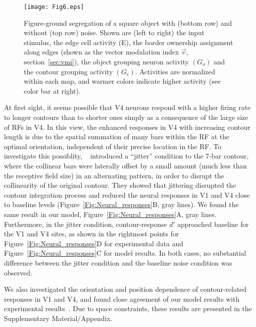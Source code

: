 {\begin{figure*}
\begin{center}
\texttt{[image: Fig6.eps]}
\end{center}
\caption{Figure-ground segregation of a square object with (bottom
  row) and without (top row) noise. Shown are (left to right) the input
  stimulus, the edge cell activity (E), the border ownership
  assignment along edges (shown as the vector modulation index $\vec{v}$,
  section~\ref{sec:vmi}), the object grouping 
  neuron activity 
$(G_o)$
 and the contour grouping activity
$(G_c)$.
 Activities are normalized within each map, and warmer colors
  indicate higher activity (see color bar at right).}
\label{Fig:Square}
\end{figure*}

At first sight, it seems possible that 
V4 neurons respond with a higher firing rate to longer contours than
to shorter ones simply as a consequence of 
the large size of RFs in V4. 
In this view, the enhanced responses in V4 with increasing contour
length is due to the spatial summation of many bars
within the RF at the optimal orientation,
independent of their precise location in the RF. 
To  investigate this possiblity,
~\cite{Chen_etal14} introduced a ``jitter'' condition to the 7-bar
contour, where the collinear bars were laterally offset 
by a small amount (much less than the receptive field size)
in an alternating pattern, in order to disrupt the collinearity of the original contour. They showed that jittering disrupted the
contour integration process and reduced the neural responses in V1
and V4 close to baseline levels (Figure~\ref{Fig:Neural_responses}B,
gray lines). We found the same result in our model,
Figure~\ref{Fig:Neural_responses}A, gray lines.  Furthermore, in the
jitter condition, contour-response $d'$ approached baseline for the
V1 and V4 sites, as shown in the rightmost points for
Figure~\ref{Fig:Neural_responses}D for experimental data and
Figure~\ref{Fig:Neural_responses}C for model results. In both cases,
no substantial difference between the jitter condition and the
baseline noise condition was observed.

We also investigated the orientation and position dependence of contour-related responses in V1 and V4, and found close agreement of our model results with experimental results~\citep{Chen_etal14}. Due to space constraints, these results are presented in the Supplementary Material/Appendix. %

}
